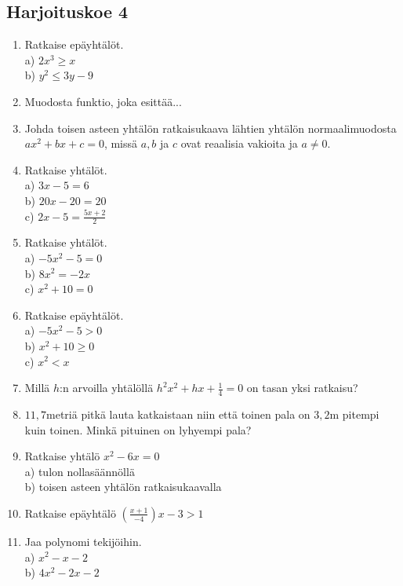 \subsection*{Harjoituskoe 4}

\begin{enumerate}


\item Ratkaise epäyhtälöt. \\
a) $2x^3 \geq x$ \\
b) $y^2 \leq 3y -9 $

\item Muodosta funktio, joka esittää...

\item Johda toisen asteen yhtälön ratkaisukaava lähtien yhtälön normaalimuodosta $ax^2+bx+c=0$, missä $a, b$ ja $c$ ovat reaalisia vakioita ja $a \neq 0$.
\item Ratkaise yhtälöt.\\ a) $3x-5=6$\\ b) $20x-20=20$\\ c) $2x-5=\frac{5x+2}{2}$
\item Ratkaise yhtälöt.\\ a) $-5x^2-5=0$\\ b) $8x^2=-2x$\\ c) $x^2+10=0$
\item Ratkaise epäyhtälöt.\\ a) $-5x^2-5>0$\\ b) $x^2+10\geq0$\\ c) $x^2<x$
\item Millä $h$:n arvoilla yhtälöllä $h^2x^2+hx+\frac{1}{4}=0$ on tasan yksi ratkaisu?
\item $11,7$metriä pitkä lauta katkaistaan niin että toinen pala on $3,2$m pitempi kuin toinen. Minkä pituinen on lyhyempi pala?
\item Ratkaise yhtälö $x^2-6x=0$\\ a) tulon nollasäännöllä\\ b) toisen asteen yhtälön ratkaisukaavalla
\item Ratkaise epäyhtälö $(\frac{x+1}{-4})x-3>1$
\item Jaa polynomi tekijöihin.\\ a) $x^2-x-2$\\ b) $4x^2-2x-2$


\end{enumerate}

